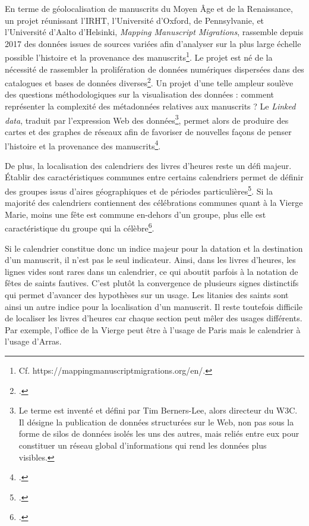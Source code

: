 \documentclass[a4paper,12pt,twoside]{book}
\begin{document}
En terme de géolocalisation de manuscrits du Moyen Âge et de la Renaissance, un projet réunissant l'IRHT, l'Université d'Oxford, de Pennsylvanie, et l'Université d'Aalto d'Helsinki, \textit{Mapping Manuscript Migrations}, rassemble depuis 2017 des données issues de sources variées afin d'analyser sur la plus large échelle possible l'histoire et la provenance des manuscrits\footnote{Cf. https://mappingmanuscriptmigrations.org/en/.}. Le projet est né de la nécessité de rassembler la prolifération de données numériques dispersées dans des catalogues et bases de données diverses\footcite[p. 249-250]{map_man_migration}. Un projet d'une telle ampleur soulève des questions méthodologiques sur la visualisation des données : comment représenter la complexité des métadonnées relatives aux manuscrits ? Le \textit{Linked data}, traduit par l'expression Web des données\footnote{Le terme est inventé et défini par Tim Berners-Lee, alors directeur du W3C. Il désigne la publication de données structurées sur le Web, non pas sous la forme de silos de données isolés les uns des autres, mais reliés entre eux pour constituer un réseau global d'informations qui rend les données plus visibles.}, permet alors de produire des cartes et des graphes de réseaux afin de favoriser de nouvelles façons de penser l'histoire et la provenance des manuscrits\footcite[p. 251]{map_man_migration}.

	
	De plus, la localisation des calendriers des livres d'heures reste un défi majeur. Établir des caractéristiques communes entre certains calendriers permet de définir des groupes issus d'aires géographiques et de périodes particulières\footcite[p. 781]{analyse_calendrier}. Si la majorité des calendriers contiennent des célébrations communes quant à la Vierge Marie, moins une fête est commune en-dehors d'un groupe, plus elle est caractéristique du groupe qui la célèbre\footcite[p. 781]{analyse_calendrier}. 
	
	Si le calendrier constitue donc un indice majeur pour la datation et la destination d'un manuscrit, il n'est pas le seul indicateur. Ainsi, dans les livres d'heures, les lignes vides sont rares dans un calendrier, ce qui aboutit parfois à la notation de fêtes de saints fautives. C'est plutôt la convergence de plusieurs signes distinctifs qui permet d'avancer des hypothèses sur un usage. Les litanies des saints sont ainsi un autre indice pour la localisation d'un manuscrit. Il reste toutefois difficile de localiser les livres d’heures car chaque section peut mêler des usages différents. Par exemple, l'office de la Vierge peut être à l’usage de Paris mais le calendrier à l’usage d’Arras.\\
	
\end{document}
